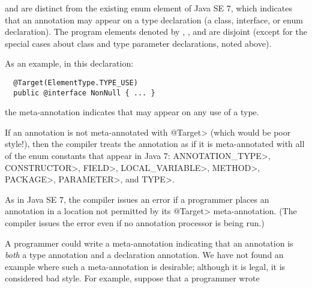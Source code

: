 \documentclass[10pt]{article}
\begin{document}
 and  are
distinct from the existing  enum element
of Java SE 7, which indicates that an annotation may appear on a type
declaration (a class, interface, or enum declaration).  The program elements
denoted by ,
, and  are disjoint
(except for the special cases about class and type parameter declarations,
noted above).


As an example, in this declaration:

\preverbnegspace
\begin{Verbatim}
  @Target(ElementType.TYPE_USE)
  public @interface NonNull { ... }
\end{Verbatim}

\noindent
the  meta-annotation indicates that
 may appear on any use of a type.

If an annotation is not meta-annotated with \<@Target> (which would be poor
style!), then the compiler treats the annotation as if it is
meta-annotated with all of the  enum constants
that appear in Java 7: \<ANNOTATION\_TYPE>, \<CONSTRUCTOR>, \<FIELD>,
\<LOCAL\_VARIABLE>, \<METHOD>, \<PACKAGE>, \<PARAMETER>, and \<TYPE>.

As in Java SE 7, the compiler issues an error if a programmer places an
annotation in a location not permitted by its \<@Target> meta-annotation.  (The
compiler issues the error even if no annotation processor is being run.)

A programmer could write a  meta-annotation indicating that an
annotation is \emph{both} a type annotation and a declaration annotation.
We have not found an example where such a meta-annotation is desirable;
although it is legal, it is considered bad style.
For example, suppose that a programmer wrote 
\end{document}
